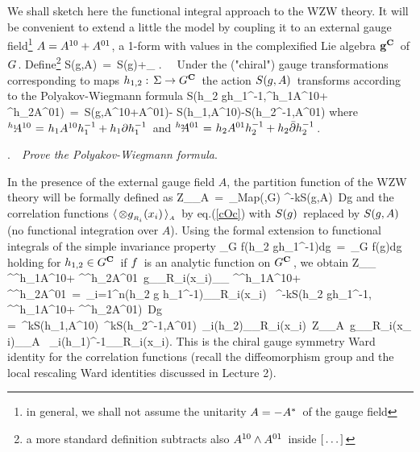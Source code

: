 We shall sketch here the functional integral approach
to the WZW theory. It will be convenient to extend a little
the model by coupling it to an external gauge
field\footnote{in general, we shall not assume the unitarity
\s$A=-A^*\hspace{0.05cm}$ of the gauge field}
\s$A=A^{10}+A^{01}\hspace{0.025cm}$, \s a 1-form with values in
the complexified Lie algebra \s${\bf g}^{{{\bf C}}}\hspace{0.05cm}$ of \s$G\hspace{0.025cm}$.
Define\footnote{a more standard definition subtracts
also \s$A^{10}\wedge A^{01}\hspace{0.05cm}$ inside \s$[\hspace{0.05cm}\dots\hspace{0.05cm}]\hspace{0.05cm}$}
\qq
S(g,A)\ =\ S(g)\s+\int\limits_\Sigma
\tr\s{}\s.\ \
\qqq
Under the ("chiral") gauge transformations corresponding
to maps \s$h_{1,2}:\hspace{0.05cm}\Sigma\rightarrow G^{{\bf C}}\hspace{0.05cm}$
the action \s$S(g,A)\hspace{0.05cm}$ transforms according to the
Polyakov-Wiegmann formula
\qq
S(h_2 g\m h_1^{-1},\s{}^{h_1}\hs{-0.14cm}A^{10}\m+
{}^{h_2}\hs{-0.14cm}A^{01})\ =\ S(g\m,\s A^{10}+A^{01})\s-\s
S(h_1,\s A^{10})\s-\s S(h_2^{-1},\s A^{01})
\qqq
where \s${}^{h_1}\hs{-0.14cm}A^{10}\m=\m h_1 A^{10}h_1^{-1}+
h_1\da h_1^{-1}\s$ and \s${}^{h_2}\hs{-0.14cm}A^{01}\m=\m
h_2 A^{01}h_2^{-1}+h_2\de h_2^{-1}\s$.
\vs 0.7cm


.\ \ {\it Prove the Polyakov-Wiegmann formula}.
\vs 0.7cm


\no In the presence of the external gauge field $A$,
the partition function of the WZW theory will be formally
defined as
\qq
Z_{_A}\ =\ \int\limits_{Map(\Sigma,G)}
\hs{-0.2cm}\ee^{-k\m S(g,A)}\ Dg
\label{PFW}
\qqq
and the correlation functions
\s$\langle\hspace{0.05cm}\otimes g_{_{R_i}}(x_i)\hspace{0.05cm}\rangle_{_A}\hspace{0.05cm}$
by eq.\s\s(\ref{cOc}) with \s$S(g)\hspace{0.05cm}$
replaced by \s$S(g,A)\hspace{0.05cm}$ (no functional integration over $A$).
Using the formal extension to functional
integrals of the simple invariance property
\qq
\int\limits_G f(h_2 g\m h_1^{-1})\s\s dg\ =\
\int\limits_G f(g)\s\s dg
\non
\qqq
holding for \s$h_{1,2}\in G^{{\bf C}}\hspace{0.05cm}$ if \s$f\hspace{0.05cm}$ is an
analytic function on \s$G^{{\bf C}}\hspace{0.05cm}$, we obtain
\qq
Z_{_{
\s{}^{^{h_1}}\hs{-0.14cm}A^{10}\m+
{}^{^{h_2}}\hs{-0.14cm}A^{01}}}\
\langle\s\otimes g_{_{R_i}}(x_i)\s\rangle_{_{
\s{}^{^{h_1}}\hs{-0.14cm}A^{10}\m+
{}^{^{h_2}}\hs{-0.14cm}A^{01}}}\
=\ \int\mathop{\otimes}\limits_{i=1}^n(h_2 g\m
h_1^{-1})_{_{R_i}}(x_i)
\ \ee^{-k\m S(h_2 g\m h_1^{-1},
\s{}^{^{h_1}}\hs{-0.12cm}A^{10}\m+\s
{}^{^{h_2}}\hs{-0.12cm}A^{01})}\ Dg\s\m\cr\cr
=\ \ee^{\m k\m S(h_1,\m A^{10})}\
\ee^{\m k\m S(h_2^{-1},\m A^{01})}\
\mathop{\otimes}\limits_i(h_2)_{_{R_i}}(x_i)\
Z_{_A}\ \langle\s\otimes g_{_{R_i}}(x_i)\s\rangle_{_A}
\ \mathop{\otimes}\limits_i(h_1)^{-1}_{_{R_i}}(x_i)\s.
\label{CWI}
\qqq
This is the chiral gauge symmetry Ward identity for
the correlation functions (recall the diffeomorphism
group and the local rescaling Ward identities discussed
in Lecture 2).
\vskip 0.3cm

